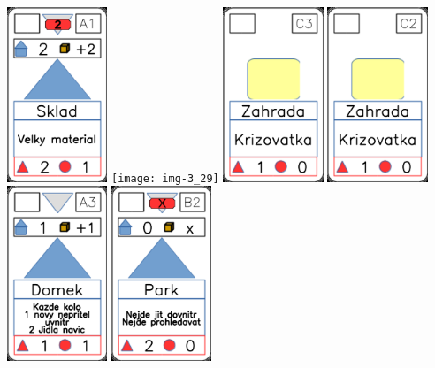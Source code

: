 \documentclass[a4paper]{article}
\begin{document}
	\includegraphics[width=3.0cm]{img-3_15}
	\texttt{[image: img-3\_29]}
	\includegraphics[width=3.0cm]{img-2_27}
	\includegraphics[width=3.0cm]{img-3_26}
	\includegraphics[width=3.0cm]{img-3_2}
	\includegraphics[width=3.0cm]{img-3_21}
\end{document}
